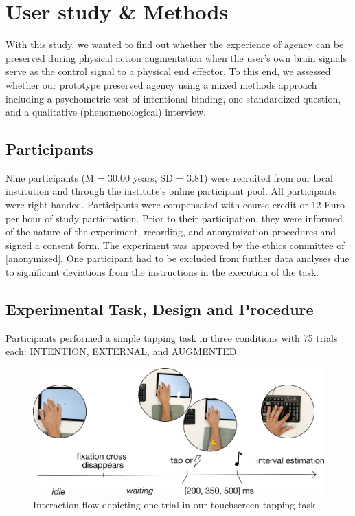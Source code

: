 
\section{User study \& Methods}
With this study, we wanted to find out whether the experience of agency can be preserved during physical action augmentation when the user's own brain signals serve as the control signal to a physical end effector. To this end, we assessed whether our prototype preserved agency using a mixed methods approach including a psychometric test of intentional binding, one standardized question, and a qualitative (phenomenological) interview.

\subsection{Participants}
Nine participants (M = 30.00 years, SD = 3.81) were recruited from our local institution and through the institute's online participant pool. All participants were right-handed. Participants were compensated with course credit or 12 Euro per hour of study participation. Prior to their participation, they were informed of the nature of the experiment, recording, and anonymization procedures and signed a consent form. The experiment was approved by the ethics committee of [anonymized]. One participant had to be excluded from further data analyses due to significant deviations from the instructions in the execution of the task.

\subsection{Experimental Task, Design and Procedure}
Participants performed a simple tapping task in three conditions with 75 trials each: INTENTION, EXTERNAL, and AUGMENTED.

\begin{figure}
    \centering
    \includegraphics[width=\columnwidth]{figures/task_new.pdf}
    \caption{Interaction flow depicting one trial in our touchscreen tapping task.}
    \label{fig:progression}
\end{figure}

